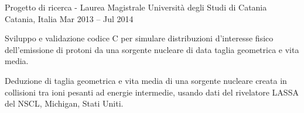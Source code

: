   \begin{cventries}
    \cventry
    {Progetto di ricerca - Laurea Magistrale}
    {Università degli Studi di Catania}
    {Catania, Italia}
    {Mar 2013 -- Jul 2014}
    {
    \begin{cvitems}
      \item Sviluppo e validazione codice C per simulare distribuzioni d'interesse fisico dell'emissione di protoni da una sorgente nucleare di data taglia geometrica e vita media.
      \item Deduzione di taglia geometrica e vita media di una sorgente nucleare creata in collisioni tra ioni pesanti ad energie intermedie, usando dati del rivelatore LASSA del NSCL, Michigan, Stati Uniti.
    \end{cvitems}
    }
  \end{cventries}